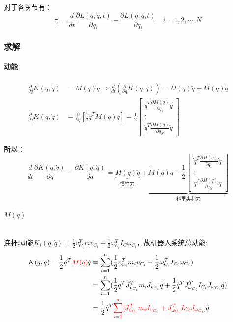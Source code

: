 \documentclass[
12pt, %
a4paper, 
oneside, %
headinclude,footinclude, %
]{scrartcl}
\begin{document}
对于各关节有：
$$ \tau_i = \frac{d}{d t}\frac{\partial L(q, \dot{q}, t)}{\partial \dot{q}_i} - \frac{\partial L(q, \dot{q}, t)}{\partial q_i} \quad i = 1, 2, \cdots, N $$
\subsubsection[求解]{求解}
\paragraph{动能}
\begin{align*}
\frac{\partial}{\partial\dot{q}}K(q, \dot{q}) &= M(q) \dot{q} \Rightarrow \frac{d}{d t}(\frac{\partial}{\partial \dot{q}}K(q, \dot{q})) = M(q) \ddot{q} + \dot{M}(q) \dot{q} \\
\frac{\partial}{\partial q}K(q, \dot{q}) &= \frac{\partial}{\partial q}[\frac{1}{2}\dot{q}^T M(q) \dot{q}] = \frac{1}{2} \begin{bmatrix} \dot{q}^T \frac{\partial M(q)}{\partial q_1}\dot{q} \\ \vdots \\ \dot{q}^T \frac{\partial M(q)}{\partial q_N}\dot{q} \end{bmatrix}
\end{align*}

所以：
$$ \frac{d}{dt}\frac{\partial K(q, \dot{q})}{\partial\dot{q}} - \frac{\partial K(q, \dot{q})}{\partial q} = \underbrace{M(q) \ddot{q}}_{\text{惯性力}} + \underbrace{\dot{M}(q) \dot{q} - \frac{1}{2}\begin{bmatrix} \dot{q}^T \frac{\partial M(q)}{\partial q_1}\dot{q} \\ \vdots \\ \dot{q}^T \frac{\partial M(q)}{\partial q_N}\dot{q} \end{bmatrix}}_{\text{科里奥利力}} $$
\paragraph{$ M(q) $}\label{sec:bingxing_back2}~\\

连杆$ i $动能$ K_i(q, \dot{q}) = \frac{1}{2}v_{C_i}^T mv_{C_i} + \frac{1}{2}\omega_{C_i}^T I_C \omega_{C_i} $，故机器人系统总动能:
\begin{align*}
K(q, \dot{q}) = \frac{1}{2}\dot{q}^T \textcolor{red}{M(q)} \dot{q} &\equiv \sum_{i = 1}^{n}(\frac{1}{2}v_{C_i}^T m_i v_{C_i} + \frac{1}{2}\omega_{C_i}^T I_{C_i} \omega_{C_i}) \\
&= \sum_{i = 1}^{n}(\frac{1}{2}\dot{q}^T J_{v_{C_i}}^T m_i J_{v_{C_i}} \dot{q} + \frac{1}{2}\dot{q}^T J_{\omega_{C_i}}^T I_{C_i} J_{\omega_{C_i}} \dot{q}) \\
&= \frac{1}{2}\dot{q}^T \textcolor{red}{\sum_{i = 1}^{n}[J_{v_{C_i}}^T m_i J_{v_{C_i}} + J_{\omega_{C_i}}^T I_{C_i} J_{\omega_{C_i}}]} \dot{q}
\end{align*}
\end{document}
